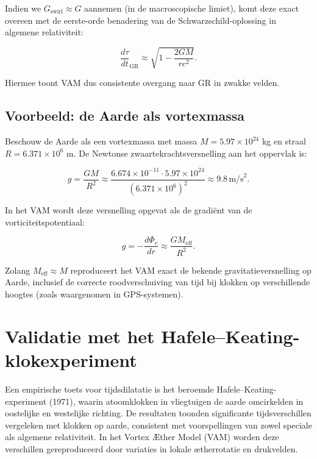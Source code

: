 Indien we $G_{\text{swirl}} \approx G$ aannemen (in de macroscopische limiet), komt deze exact overeen met de eerste-orde benadering van de Schwarzschild-oplossing in algemene relativiteit:

\begin{equation}
\frac{d\tau}{dt}_\text{GR} \approx \sqrt{1 - \frac{2GM}{rc^2}}.
\end{equation}

Hiermee toont VAM dus consistente overgang naar GR in zwakke velden.

\subsection{Voorbeeld: de Aarde als vortexmassa}

Beschouw de Aarde als een vortexmassa met massa $M = 5.97 \times 10^{24}$ kg en straal $R = 6.371 \times 10^6$ m. De Newtonse zwaartekrachtsversnelling aan het oppervlak is:

\begin{equation}
g = \frac{G M}{R^2} \approx \frac{6.674 \times 10^{-11} \cdot 5.97 \times 10^{24}}{(6.371 \times 10^6)^2} \approx 9.8 \, \text{m/s}^2.
\end{equation}

In het VAM wordt deze versnelling opgevat als de gradiënt van de vorticiteitspotentiaal:

\begin{equation}
g = -\frac{d\Phi_v}{dr} \approx \frac{G M_{\text{eff}}}{R^2}.
\end{equation}

Zolang $M_{\text{eff}} \approx M$ reproduceert het VAM exact de bekende gravitatieversnelling op Aarde, inclusief de correcte roodverschuiving van tijd bij klokken op verschillende hoogtes (zoals waargenomen in GPS-systemen).

\section{Validatie met het Hafele–Keating-klokexperiment}

Een empirische toets voor tijdsdilatatie is het beroemde Hafele–Keating-experiment (1971), waarin atoomklokken in vliegtuigen de aarde omcirkelden in oostelijke en westelijke richting. De resultaten toonden significante tijdsverschillen vergeleken met klokken op aarde, consistent met voorspellingen van zowel speciale als algemene relativiteit. In het Vortex Æther Model (VAM) worden deze verschillen gereproduceerd door variaties in lokale ætherrotatie en drukvelden.

